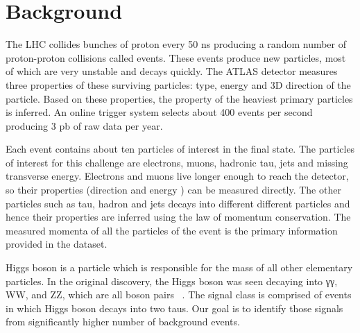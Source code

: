 \section{Background}
\label{sec:background}

The LHC collides bunches of proton every 50 ns producing a random number of proton-proton collisions called events. These events produce new particles, most of which are very unstable and decays quickly. The ATLAS detector measures three properties of these surviving particles: type, energy and 3D direction of the particle. Based on these properties,  the property of the heaviest primary particles is inferred. An online trigger system selects about 400 events per second producing 3 pb of raw data per year.

Each event contains about ten particles of interest in the final state. The particles of interest for this challenge are electrons, muons, hadronic tau, jets and missing transverse energy. Electrons and muons live longer enough to reach the detector, so their properties (direction and energy ) can be measured directly. The other particles such as tau, hadron and jets decays into different different particles and hence their properties are inferred using the law of momentum conservation.  The measured momenta of all the particles of the event is the primary information provided in the dataset. 

Higgs boson is a particle which is responsible for the mass of all other elementary particles. In the original discovery, the Higgs boson was seen decaying into γγ, WW, and ZZ, which are all boson pairs~\cite{Ananya1,Ananya2} . The signal class is comprised of events in which Higgs boson decays into two taus. Our goal is to identify those signals from significantly higher number of background events.
